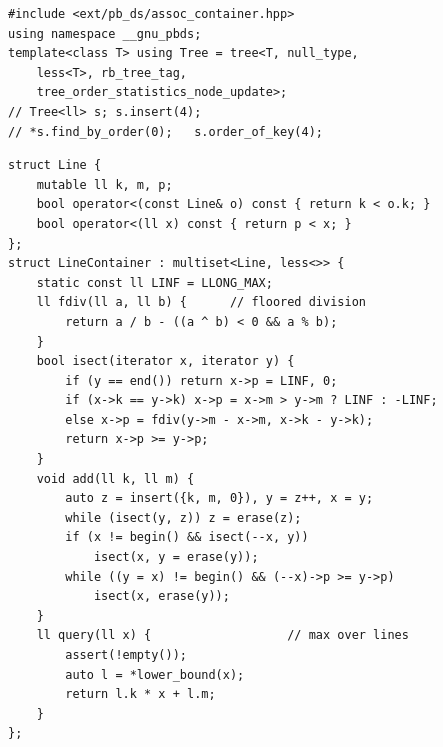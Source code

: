 
\begin{lstlisting}
#include <ext/pb_ds/assoc_container.hpp>
using namespace __gnu_pbds;
template<class T> using Tree = tree<T, null_type,
    less<T>, rb_tree_tag,
    tree_order_statistics_node_update>;
// Tree<ll> s; s.insert(4);
// *s.find_by_order(0);   s.order_of_key(4);
\end{lstlisting}


\begin{lstlisting}
struct Line {
    mutable ll k, m, p;
    bool operator<(const Line& o) const { return k < o.k; }
    bool operator<(ll x) const { return p < x; }
};
struct LineContainer : multiset<Line, less<>> {
    static const ll LINF = LLONG_MAX;
    ll fdiv(ll a, ll b) {      // floored division
        return a / b - ((a ^ b) < 0 && a % b);
    }
    bool isect(iterator x, iterator y) {
        if (y == end()) return x->p = LINF, 0;
        if (x->k == y->k) x->p = x->m > y->m ? LINF : -LINF;
        else x->p = fdiv(y->m - x->m, x->k - y->k);
        return x->p >= y->p;
    }
    void add(ll k, ll m) {
        auto z = insert({k, m, 0}), y = z++, x = y;
        while (isect(y, z)) z = erase(z);
        if (x != begin() && isect(--x, y))
            isect(x, y = erase(y));
        while ((y = x) != begin() && (--x)->p >= y->p)
            isect(x, erase(y));
    }
    ll query(ll x) {                   // max over lines
        assert(!empty());
        auto l = *lower_bound(x);
        return l.k * x + l.m;
    }
};
\end{lstlisting}

